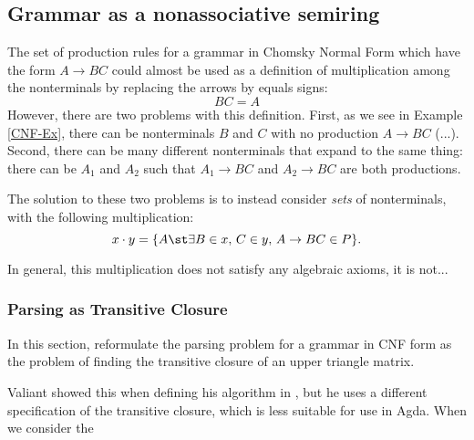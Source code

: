 \subsection{Grammar as a nonassociative semiring}
The set of production rules for a grammar in Chomsky Normal Form which have the form $A \to BC$ could almost be used as a definition of multiplication among the nonterminals by replacing the arrows by equals signs:
\begin{equation*}
  BC = A
\end{equation*}
However, there are two problems with this definition. First, as we see in Example \ref{CNF-Ex}, there can be nonterminals $B$ and $C$ with no production $A \to BC$ (...). Second, there can be many different nonterminals that expand to the same thing: there can be $A_1$ and $A_2$ such that $A_1 \to BC$ and $A_2 \to BC$ are both productions.

The solution to these two problems is to instead consider \emph{sets} of nonterminals, with the following multiplication:
\begin{equation*}
  x \cdot y = \{A \st \exists B \in x,\, C \in y,\, A \to BC \in P\}.
\end{equation*}

In general, this multiplication does not satisfy any algebraic axioms, it is not... 
\subsubsection{Parsing as Transitive Closure}
In this section, reformulate the parsing problem for a grammar in CNF form as the problem of finding the transitive closure of an upper triangle matrix.

Valiant showed this when defining his algorithm in \cite{Valiant}, but he uses a different specification of the transitive closure, which is  less suitable for use in Agda.
When we consider the 

